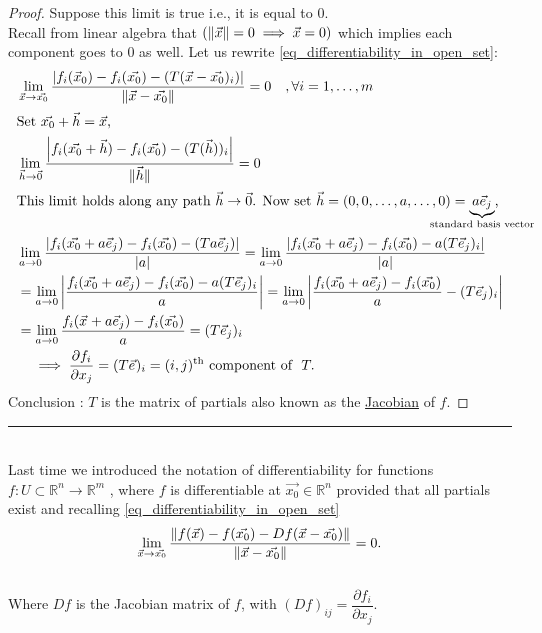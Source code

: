 \documentclass[
	12pt,
	]{article}
\newcommand{\Rn}{\mathbb{R}^{n}}
\newcommand{\Rm}{\mathbb{R}^{m}}
\DeclarePairedDelimiter{\norm}{\lVert}{\rVert}
\theoremstyle{custom}
\theoremstyle{custom}
\theoremstyle{custom}
\theoremstyle{custom}
\theoremstyle{custom}
\theoremstyle{definition}
\theoremstyle{example}
\theoremstyle{note}
\theoremstyle{remark}
\theoremstyle{example}
\numberwithin{equation}{subsection}
\begin{document}
  	\begin{proof}
  		Suppose this limit is true  i.e., it is equal to $0$. \\
  		Recall from linear algebra that $(\norm{\vec{x}} = 0 \implies \vec{x} = 0)$ which implies each component goes to $0$ as well.
  		Let us rewrite \eqref{eq_differentiability_in_open_set}: 
  		\begin{align*}
  			&\lim_{\vec{x} \to \vec{x_{0}}} \frac{\abs{f_{i}(\vec{x}_{0}) -f_{i}(\vec{x_{0}}) - (T(\vec{x} -\vec{x_{0}})_{i})}}{\norm{\vec{x} - \vec{x_{0}}}} = 0 \quad, \forall i = 1,\dots ,m \\
  			\intertext{Set $\vec{x_{0}} +\vec{h} = \vec{x}$,}
  			&\lim_{\vec{h}\to \vec{0}}\frac{\abs{f_{i}(\vec{x_{0}}+\vec{h}) -f_{i}(\vec{x_{0}}) -(T(\vec{h}))_{i}}}{\norm{\vec{h}}} = 0 \\
  			\intertext{This limit holds along any path $\vec{h} \to \vec{0}$. Now  set $\vec{h} = (0,0,\dots,a, \dots,0) = \underbrace{a\vec{e}_{j}}_{\mathclap{\text{standard basis vector}}}$,} 
  			&\lim_{a \to 0} \frac{\abs{f_{i}(\vec{x_{0}} + a\vec{e}_{j}) - f_{i}(\vec{x_{0}}) - (Ta\vec{e}_{j})}}{\abs{a}} = \lim_{a\to 0} \frac{\abs{f_{i}(\vec{x_{0}} + a\vec{e}_{j}) -f_{i}(\vec{x_{0}}) - a(T\vec{e}_{j})_{i}}}{\abs{a}} \\
  			&= \lim_{a\to 0} \abs{\frac{f_{i}(\vec{x_{0}} + a\vec{e}_{j}) - f_{i}(\vec{x_{0}}) - a(T\vec{e}_{j})_{i}}{a}} = \lim_{a\to 0} \abs{\frac{f_{i}(\vec{x_{0}} + a\vec{e}_{j}) - f_{i}(\vec{x_{0}})}{a} -(T\vec{e}_{j})_{i}} \\
  			&= \lim_{a\to 0} \frac{f_{i}(\vec{x_{}} + a\vec{e}_{j}) -f_{i}(\vec{x_{0}})}{a} = (T\vec{e}_{j})_{i} \\
  			& \quad \implies \pdv{f_{i}}{x_{j}} = (T\vec{e}_{})_{i} = (i,j)^{\text{th}} \ \text{component of } \ T.
  		\end{align*}
  		Conclusion : $T$ is the matrix of partials also known as the \underline{Jacobian} of $f$.
    \end{proof}
    
  	\rule{\linewidth}{0.4 pt}
  	\\
  	Last time we introduced the notation of differentiability for functions $f: U \subset \Rn \to \Rm$ , where $f$ is differentiable at $\vec{x_{0}} \in \Rn$ provided that all partials exist and recalling \eqref{eq_differentiability_in_open_set}
  	$$ \lim_{\vec{x} \to \vec{x_{0}}} \frac{\norm{f(\vec{x}) - f(\vec{x_{0}}) - D{f}(\vec{x}-\vec{x_{0}})}}{\norm{\vec{x} - \vec{x_{0}}}}= 0.$$ \\
  	Where $D{f}$ is the Jacobian matrix of $f$, with $(D{f})_{ij} = \dfrac{\partial f_{i}}{\partial x_{j}}$.
  	
\end{document}
